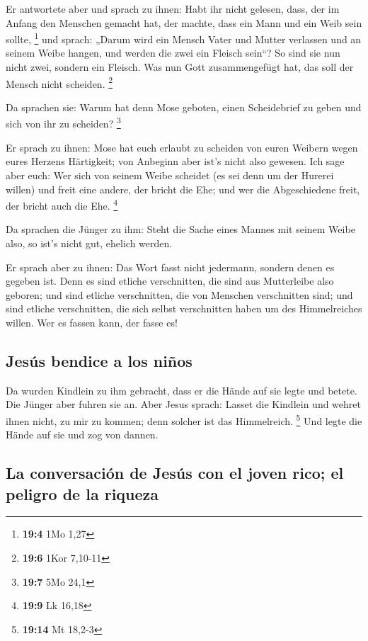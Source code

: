  Er antwortete aber und sprach zu ihnen: Habt ihr nicht
gelesen, dass, der im Anfang den Menschen gemacht hat, der machte, dass
ein Mann und ein Weib sein sollte, \footnote{\textbf{19:4} 1Mo 1,27}
 und sprach: „Darum wird ein Mensch Vater und Mutter
verlassen und an seinem Weibe hangen, und werden die zwei ein Fleisch
sein``?  So sind sie nun nicht zwei, sondern ein Fleisch.
Was nun Gott zusammengefügt hat, das soll der Mensch nicht scheiden.
\footnote{\textbf{19:6} 1Kor 7,10-11}

 Da sprachen sie: Warum hat denn Mose geboten, einen
Scheidebrief zu geben und sich von ihr zu scheiden? \footnote{\textbf{19:7}
  5Mo 24,1}

 Er sprach zu ihnen: Mose hat euch erlaubt zu scheiden von
euren Weibern wegen eures Herzens Härtigkeit; von Anbeginn aber ist's
nicht also gewesen.  Ich sage aber euch: Wer sich von
seinem Weibe scheidet (es sei denn um der Hurerei willen) und freit eine
andere, der bricht die Ehe; und wer die Abgeschiedene freit, der bricht
auch die Ehe. \footnote{\textbf{19:9} Lk 16,18}

 Da sprachen die Jünger zu ihm: Steht die Sache eines
Mannes mit seinem Weibe also, so ist's nicht gut, ehelich werden.

 Er sprach aber zu ihnen: Das Wort fasst nicht jedermann,
sondern denen es gegeben ist.  Denn es sind etliche
verschnitten, die sind aus Mutterleibe also geboren; und sind etliche
verschnitten, die von Menschen verschnitten sind; und sind etliche
verschnitten, die sich selbst verschnitten haben um des Himmelreiches
willen. Wer es fassen kann, der fasse es!

\hypertarget{jesuxfas-bendice-a-los-niuxf1os}{%
\subsection{Jesús bendice a los
niños}\label{jesuxfas-bendice-a-los-niuxf1os}}

 Da wurden Kindlein zu ihm gebracht, dass er die Hände
auf sie legte und betete. Die Jünger aber fuhren sie an. 
Aber Jesus sprach: Lasset die Kindlein und wehret ihnen nicht, zu mir zu
kommen; denn solcher ist das Himmelreich. \footnote{\textbf{19:14} Mt
  18,2-3}  Und legte die Hände auf sie und zog von
dannen.

\hypertarget{la-conversaciuxf3n-de-jesuxfas-con-el-joven-rico-el-peligro-de-la-riqueza}{%
\subsection{La conversación de Jesús con el joven rico; el peligro de la
riqueza}\label{la-conversaciuxf3n-de-jesuxfas-con-el-joven-rico-el-peligro-de-la-riqueza}}

